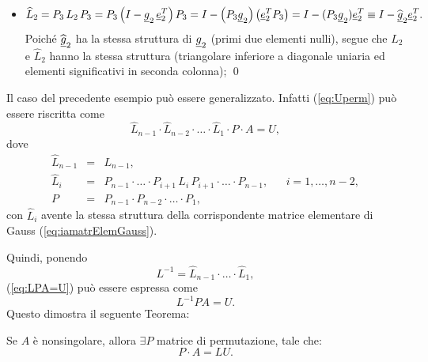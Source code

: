 \begin{example}
\begin{itemize}
        \item \begin{equation*}
            \widehat L_2 = P_3\, L_2\, P_3=P_3\left(I-\uline g_2\,\uline e_2^T\right)P_3 = I-\left(P_3\uline g_2\right)\left(\uline e_2^TP_3\right)=I-(P_3\uline g_2)\uline e_2^T\equiv I-\widehat{\uline g}_2\uline e_2^T.
        \end{equation*} Poiché $\widehat{\uline g}_2$ ha la stessa struttura di $\uline g_2$ (primi due elementi nulli), segue che $L_2$ e $\widehat L_2$ hanno la stessa struttura (triangolare inferiore a diagonale uniaria ed elementi significativi in seconda colonna);
        \qed
    \end{itemize}
    
    \addtocounter{footnote}{-2}
    
    
\end{example}

Il caso del precedente esempio può essere generalizzato. Infatti (\ref{eq:Uperm}) può essere riscritta come 
\begin{equation}\label{eq:LPA=U}
    \widehat L_{n-1}\cdot \widehat L_{n-2}\cdot\hdots\cdot \widehat L_{1}\cdot P \cdot A = U,
\end{equation}
dove
\begin{equation*}
    \begin{matrix}
        \widehat L_{n-1} &=& L_{n-1},\\
        \widehat L_i &=& P_{n-1}\cdot\hdots\cdot P_{i+1}\, L_i\, P_{i+1}\cdot\hdots\cdot P_{n-1}, && i=1,\hdots,n-2,\\
        P &=& P_{n-1}\cdot P_{n-2}\cdot \hdots\cdot P_1,
    \end{matrix}
\end{equation*}
con $\widehat L_i$ avente la stessa struttura della corrispondente matrice elementare di Gauss (\ref{eq:iamatrElemGauss}).

Quindi, ponendo
\begin{equation*}
    L^{-1} = \widehat L_{n-1}\cdot\hdots\cdot\widehat L_1,
\end{equation*}
(\ref{eq:LPA=U}) può essere espressa come
\begin{equation*}
    L^{-1} P A = U.
\end{equation*}
Questo dimostra il seguente Teorema:
\begin{theorem}\label{th:fattLUPerm}\footnotemark
    Se $A$ è \gls{nonsingolare}, allora $\exists P$ matrice di permutazione, tale che:
    \begin{equation}\label{eq:PA=LU}
        P\cdot A = LU.
    \end{equation}
\end{theorem}

